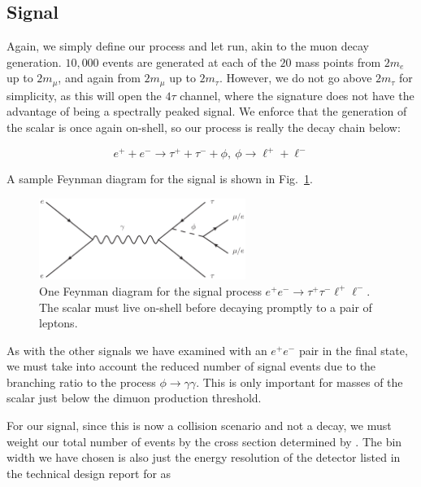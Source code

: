\subsection{Signal}
Again, we simply define our process and let \madgraph run, akin to the muon decay generation.
$10,000$ events are generated at each of the $20$ mass points from $2m_e$ up to $2m_\mu$, and again from $2m_\mu$ up to $2m_\tau$.
However, we do not go above $2m_\tau$ for simplicity, as this will open the $4\tau$ channel, where the signature does not have the advantage of being a spectrally peaked signal. 
We enforce that the generation of the scalar is once again on-shell, so our process is really the decay chain below:

\begin{equation}
    e^+ + e^- \rightarrow \tau^+ + \tau^- + \phi,~\phi \rightarrow \ell^+ + \ell^-
\end{equation}

A sample Feynman diagram for the signal is shown in Fig.~\ref{fig:ee_tautaull_scalar}.

\begin{figure}[h]
    \centering
    \includegraphics[width=0.6\textwidth]{Figures/feynman_diagrams/ee_tautaull_scalar}
    \caption[One Feynman diagram for the signal process $e^+ e^- \rightarrow \tau^+ \tau^- \ell^+ \ell^-$.]{One Feynman diagram for the signal process $e^+ e^- \rightarrow \tau^+ \tau^- \ell^+ \ell^-$. The scalar must live on-shell before decaying promptly to a pair of leptons.}
    \label{fig:ee_tautaull_scalar}
\end{figure}

As with the other signals we have examined with an $e^+ e^-$ pair in the final state, we must take into account the reduced number of signal events due to the branching ratio to the process $\phi \rightarrow \gamma \gamma$.
This is only important for masses of the scalar just below the dimuon production threshold.

For our signal, since this is now a collision scenario and not a decay, we must weight our total number of events by the cross section determined by \madgraph.
The bin width we have chosen is also just the energy resolution of the detector listed in the technical design report for \belletwo \cite{Abe:2010gxa} as


